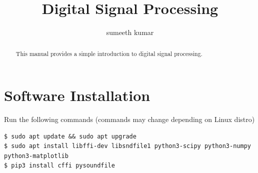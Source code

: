 \documentclass[journal,12pt,twocolumn]{IEEEtran}
\renewcommand\thesection{\arabic{section}}
\begin{document}
\makeatletter
{}
\makeatother
\let\StandardTheFigure\thefigure
\renewcommand{\thefigure}{\theproblem}
\def\putbox#1#2#3{\makebox[0in][l]{\makebox[#1][l]{}\raisebox{\baselineskip}[0in][0in]{\raisebox{#2}[0in][0in]{#3}}}}
     \def\rightbox#1{\makebox[0in][r]{#1}}
     \def\centbox#1{\makebox[0in]{#1}}
     \def\topbox#1{\raisebox{-\baselineskip}[0in][0in]{#1}}
     \def\midbox#1{\raisebox{-0.5\baselineskip}[0in][0in]{#1}}
\vspace{3cm}
\vspace{3cm}
\title{Digital Signal Processing}
\author{sumeeth kumar} 
\maketitle
\tableofcontents
\renewcommand{\thefigure}{\theenumi}
\renewcommand{\thetable}{\theenumi}
\bigskip
\begin{abstract}
This manual provides a simple introduction to digital signal processing.
\end{abstract}
\noindent \section{Software Installation}
\noindent Run the following commands (commands may change depending on Linux distro)
\begin{lstlisting}
$ sudo apt update && sudo apt upgrade
$ sudo apt install libffi-dev libsndfile1 python3-scipy python3-numpy python3-matplotlib 
$ pip3 install cffi pysoundfile 
\end{lstlisting}
\end{document}
